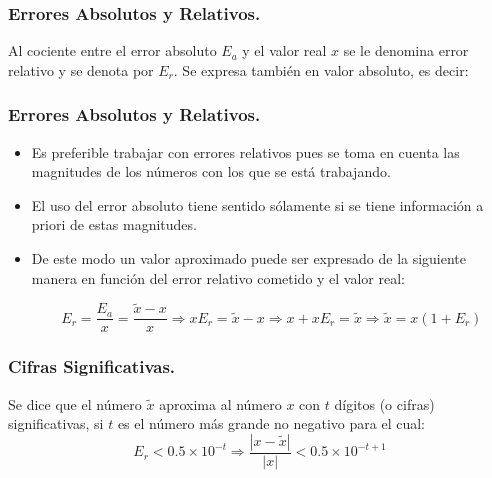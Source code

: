 \documentclass{beamer}
\begin{document}
\frame
{
  \frametitle{Errores Absolutos y Relativos.}
  Al cociente entre el error absoluto $E_a$ y el valor real $x$ se le denomina error relativo y se denota por $E_r$. Se 
expresa tambi\'en en valor absoluto, es decir:
}
\begin{frame}
\frametitle{Errores Absolutos y Relativos.}
\begin{itemize}
 \item<1-> Es preferible trabajar con errores relativos pues se toma en cuenta las magnitudes de los
 n\'umeros con los que se est\'a trabajando. 
 \item<2->El uso del error absoluto tiene sentido s\'olamente si se tiene informaci\'on a priori de estas magnitudes.
 \item <3-> De este modo un valor aproximado puede ser expresado de la siguiente manera en funci\'on del error relativo cometido y el valor real:
 \begin{block}{}
 $$
 E_r = \frac{E_a}{x} = \frac{\tilde x - x}{x}  \Rightarrow xE_r = \tilde x -x \Rightarrow x+xE_r =\tilde x \Rightarrow
 \tilde x = x(1+E_r)
 $$ 
 \end{block}
\end{itemize}
\end{frame}
\frame
{
  \frametitle{Cifras Significativas.}
  Se dice que el n\'umero $\tilde{x}$ aproxima al n\'umero $x$ con $t$ d\'igitos (o cifras) significativas, si $t$ es el n\'umero m\'as grande no negativo para el cual:
$$
E_r < 0.5\times10^{-t}\Rightarrow \frac{|x-\tilde{x}|}{|x|}<0.5\times10^{-t+1}
$$

}
\end{document}
